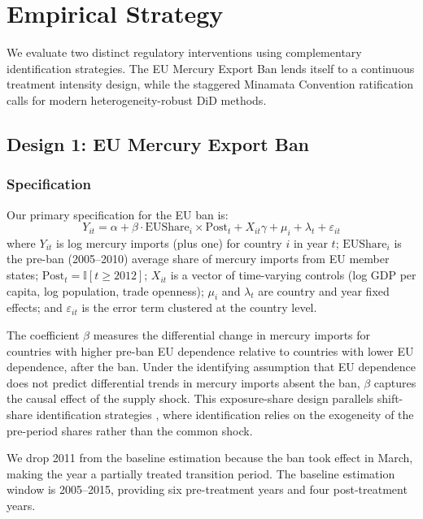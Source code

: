 \documentclass[12pt]{article}
\newcommand{\ind}{\mathbb{I}}
\begin{document}
\section{Empirical Strategy}

We evaluate two distinct regulatory interventions using complementary identification strategies. The EU Mercury Export Ban lends itself to a continuous treatment intensity design, while the staggered Minamata Convention ratification calls for modern heterogeneity-robust DiD methods.

\subsection{Design 1: EU Mercury Export Ban}

\subsubsection{Specification}

Our primary specification for the EU ban is:
\begin{equation}
\label{eq:eu_ban}
Y_{it} = \alpha + \beta \cdot \text{EUShare}_i \times \text{Post}_t + X_{it}\gamma + \mu_i + \lambda_t + \varepsilon_{it}
\end{equation}
where $Y_{it}$ is log mercury imports (plus one) for country $i$ in year $t$; $\text{EUShare}_i$ is the pre-ban (2005--2010) average share of mercury imports from EU member states; $\text{Post}_t = \ind[t \geq 2012]$; $X_{it}$ is a vector of time-varying controls (log GDP per capita, log population, trade openness); $\mu_i$ and $\lambda_t$ are country and year fixed effects; and $\varepsilon_{it}$ is the error term clustered at the country level.

The coefficient $\beta$ measures the differential change in mercury imports for countries with higher pre-ban EU dependence relative to countries with lower EU dependence, after the ban. Under the identifying assumption that EU dependence does not predict differential trends in mercury imports absent the ban, $\beta$ captures the causal effect of the supply shock. This exposure-share design parallels shift-share identification strategies \citep{goldsmithpinkham2020bartik}, where identification relies on the exogeneity of the pre-period shares rather than the common shock.

We drop 2011 from the baseline estimation because the ban took effect in March, making the year a partially treated transition period. The baseline estimation window is 2005--2015, providing six pre-treatment years and four post-treatment years.
\end{document}
